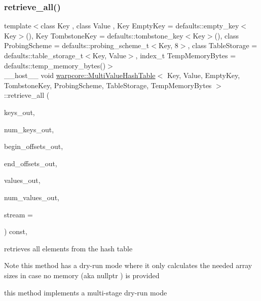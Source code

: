 \subsubsection{\texorpdfstring{retrieve\+\_\+all()}{retrieve\_all()}}
{\footnotesize\ttfamily template$<$class Key , class Value , Key Empty\+Key = defaults\+::empty\+\_\+key$<$\+Key$>$(), Key Tombstone\+Key = defaults\+::tombstone\+\_\+key$<$\+Key$>$(), class Probing\+Scheme  = defaults\+::probing\+\_\+scheme\+\_\+t$<$\+Key, 8$>$, class Table\+Storage  = defaults\+::table\+\_\+storage\+\_\+t$<$\+Key, Value$>$, index\+\_\+t Temp\+Memory\+Bytes = defaults\+::temp\+\_\+memory\+\_\+bytes()$>$ \\
\+\_\+\+\_\+host\+\_\+\+\_\+ void \hyperlink{classwarpcore_1_1MultiValueHashTable}{warpcore\+::\+Multi\+Value\+Hash\+Table}$<$ Key, Value, Empty\+Key, Tombstone\+Key, Probing\+Scheme, Table\+Storage, Temp\+Memory\+Bytes $>$\+::retrieve\+\_\+all (\begin{DoxyParamCaption}\item[{key\+\_\+type $\ast$const}]{keys\+\_\+out,  }\item[{index\+\_\+type \&}]{num\+\_\+keys\+\_\+out,  }\item[{index\+\_\+type $\ast$const}]{begin\+\_\+offsets\+\_\+out,  }\item[{index\+\_\+type $\ast$const}]{end\+\_\+offsets\+\_\+out,  }\item[{value\+\_\+type $\ast$const}]{values\+\_\+out,  }\item[{value\+\_\+type \&}]{num\+\_\+values\+\_\+out,  }\item[{const cuda\+Stream\+\_\+t}]{stream = {} }\end{DoxyParamCaption}) const\hspace{0.3cm}{\ttfamily [inline]}, {\ttfamily [noexcept]}}



retrieves all elements from the hash table 

\begin{DoxyNote}{Note}
this method has a dry-\/run mode where it only calculates the needed array sizes in case no memory (aka {\ttfamily nullptr} ) is provided 

this method implements a multi-\/stage dry-\/run mode 
\end{DoxyNote}

